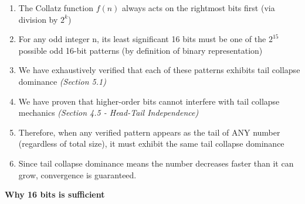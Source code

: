 \documentclass[10pt,letterpaper]{article}
\begin{document}
\begin{enumerate}
    \item The Collatz function $f(n)$ always acts on the rightmost bits first (via division by $2^k$)
    \item For any odd integer n, its least significant 16 bits must be one of the $2^{15}$ possible 
   odd 16-bit patterns (by definition of binary representation)
    \item We have exhaustively verified that each of these patterns exhibits tail collapse dominance \textit{(Section 5.1)}
    \item We have proven that higher-order bits cannot interfere with tail collapse mechanics \textit{(Section 4.5 - Head-Tail Independence)}
    \item Therefore, when any verified pattern appears as the tail of ANY number (regardless of total size), it must exhibit the same tail collapse dominance
    \item Since tail collapse dominance means the number decreases faster than it can grow, convergence is guaranteed.
\end{enumerate}








\vspace{1em}
\textbf{Why 16 bits is sufficient}
\end{document}
